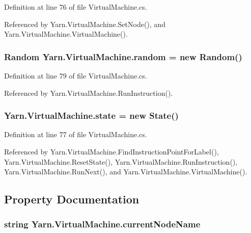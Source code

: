 Definition at line 76 of file Virtual\-Machine.\-cs.



Referenced by Yarn.\-Virtual\-Machine.\-Set\-Node(), and Yarn.\-Virtual\-Machine.\-Virtual\-Machine().

\hypertarget{a00152_a408485a00c7cc558428c86ed9dd04fca}{
\subsubsection[{random}]{\setlength{\rightskip}{0pt plus 5cm}Random Yarn.\-Virtual\-Machine.\-random = new Random()\hspace{0.3cm}{\ttfamily [private]}}}\label{a00152_a408485a00c7cc558428c86ed9dd04fca}


Definition at line 79 of file Virtual\-Machine.\-cs.



Referenced by Yarn.\-Virtual\-Machine.\-Run\-Instruction().

\hypertarget{a00152_a70f2ce6201cdd2430ceaa764ac614ca0}{
\subsubsection[{state}]{ Yarn.\-Virtual\-Machine.\-state = new {\bf State}()\hspace{0.3cm}{\ttfamily [private]}}}\label{a00152_a70f2ce6201cdd2430ceaa764ac614ca0}


Definition at line 77 of file Virtual\-Machine.\-cs.



Referenced by Yarn.\-Virtual\-Machine.\-Find\-Instruction\-Point\-For\-Label(), Yarn.\-Virtual\-Machine.\-Reset\-State(), Yarn.\-Virtual\-Machine.\-Run\-Instruction(), Yarn.\-Virtual\-Machine.\-Run\-Next(), and Yarn.\-Virtual\-Machine.\-Virtual\-Machine().



\subsection{Property Documentation}
\hypertarget{a00152_ab3afe8360a344c16c21213edb3641481}{
\subsubsection[{current\-Node\-Name}]{\setlength{\rightskip}{0pt plus 5cm}string Yarn.\-Virtual\-Machine.\-current\-Node\-Name\hspace{0.3cm}{\ttfamily [get]}}}\label{a00152_ab3afe8360a344c16c21213edb3641481}


